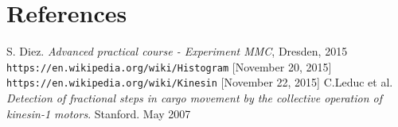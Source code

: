 \section{References}

\begin{thebibliography}{99}
 S. Diez. \textit{Advanced practical course - Experiment MMC}, Dresden, 2015
 \texttt{https://en.wikipedia.org/wiki/Histogram} [November 20, 2015]
 \texttt{https://en.wikipedia.org/wiki/Kinesin} [November 22, 2015]
 C.Leduc et al. \textit{Detection of fractional steps in cargo movement by the collective operation of kinesin-1 motors}. Stanford. May 2007

\end{thebibliography}
